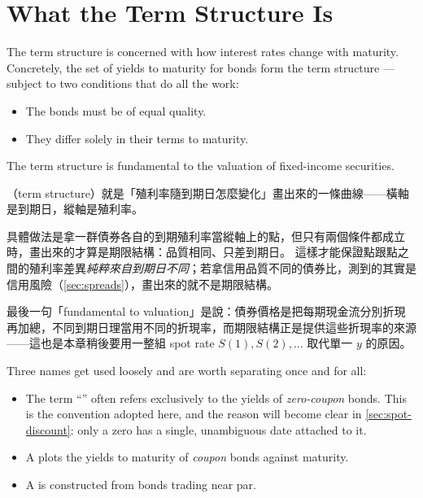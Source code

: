 \section{What the Term Structure Is}
\label{sec:what-term-structure}


The term structure is concerned with how interest rates change with maturity.
Concretely, the set of yields to maturity for bonds form the term structure --- subject to two conditions that do all the work:

\begin{itemize}[nosep]
	\item The bonds must be of equal quality.
	\item They differ solely in their terms to maturity.
\end{itemize}

The term structure is fundamental to the valuation of fixed-income securities.

\suppstart
\begin{remark}
	（term structure）就是「殖利率隨到期日怎麼變化」畫出來的一條曲線——橫軸是到期日，縱軸是殖利率。

	具體做法是拿一群債券各自的到期殖利率當縱軸上的點，但只有兩個條件都成立時，畫出來的才算是期限結構：品質相同、只差到期日。
	這樣才能保證點跟點之間的殖利率差異\emph{純粹來自到期日不同}；若拿信用品質不同的債券比，測到的其實是信用風險（\autoref{sec:spreads}），畫出來的就不是期限結構。

	最後一句「fundamental to valuation」是說：債券價格是把每期現金流分別折現再加總，不同到期日理當用不同的折現率，而期限結構正是提供這些折現率的來源——這也是本章稍後要用一整組 spot rate $S(1),S(2),\dots$ 取代單一 $y$ 的原因。
\end{remark}
\suppend


Three names get used loosely and are worth separating once and for all:

\begin{itemize}[itemsep=0.35em]
	\item The term ``'' often refers exclusively to the yields of \emph{zero-coupon} bonds.
	      This is the convention adopted here, and the reason will become clear in \autoref{sec:spot-discount}: only a zero has a single, unambiguous date attached to it.
	\item A  plots the yields to maturity of \emph{coupon} bonds against maturity.
	\item A  is constructed from bonds trading near par.
\end{itemize}

